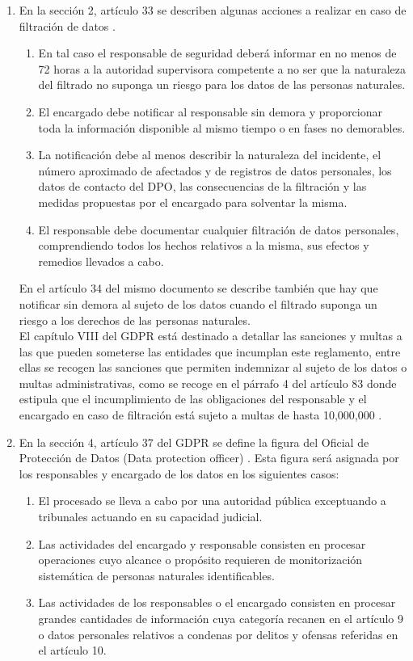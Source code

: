 \documentclass[a4paper,oneside]{article}
\begin{document}
\begin{enumerate}[label=\textbf{\alph*)}]
\item 
En la sección 2, artículo 33 se describen algunas acciones a realizar en caso de filtración de datos \cite{rgpd}. 
\begin{enumerate}[label=\arabic*)]
\item En tal caso el responsable de seguridad deberá informar en no menos de 72 horas a la autoridad supervisora competente a no ser que la naturaleza del filtrado no suponga un riesgo para los datos de las personas naturales.
\item El encargado debe notificar al responsable sin demora y proporcionar toda la información disponible al mismo tiempo o en fases no demorables.
\item La notificación debe al menos describir la naturaleza del incidente, el número aproximado de afectados y de registros de datos personales, los datos de contacto del DPO, las consecuencias de la filtración y las medidas propuestas por el encargado para solventar la misma.
\item El responsable debe documentar cualquier filtración de datos personales, comprendiendo todos los hechos relativos a la misma, sus efectos y remedios llevados a cabo.
\end{enumerate}

En el artículo 34 del mismo documento se describe también que hay que notificar sin demora al sujeto de los datos cuando el filtrado suponga un riesgo a los derechos de las personas naturales.\\
El capítulo VIII del GDPR está destinado a detallar las sanciones y multas a las que pueden someterse las entidades que incumplan este reglamento, entre ellas se recogen las sanciones que permiten indemnizar al sujeto de los datos o multas administrativas, como se recoge en el párrafo 4 del artículo 83 donde estipula que el incumplimiento de las obligaciones del responsable y el encargado en caso de filtración está sujeto a multas de hasta 10,000,000\EUR{} \cite{gdpr}.

\item 
En la sección 4, artículo 37 del GDPR se define la figura del Oficial de Protección de Datos (Data protection officer) \cite{gdpr} . Esta figura será asignada por los responsables y encargado de los datos en los siguientes casos:
\begin{enumerate}
\item El procesado se lleva a cabo por una autoridad pública exceptuando a tribunales actuando en su capacidad judicial.
\item Las actividades del encargado y responsable consisten en procesar operaciones cuyo alcance o propósito requieren de monitorización sistemática de personas naturales identificables.
\item Las actividades de los responsables o el encargado consisten en procesar grandes cantidades de información cuya categoría recanen en el artículo 9 o datos personales relativos a condenas por delitos y ofensas referidas en el artículo 10.
\end{enumerate}


\end{enumerate}
\end{document}

